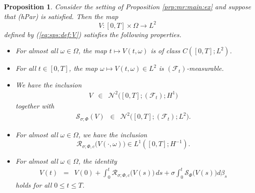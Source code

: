 \documentclass[10pt]{articleHJ}
\newcommand{\Real}{\mathbb{R}}							%
\newcommand{\sref}[1]{(\ref{#1})}                       %
\newtheorem{prop}[thm]{Proposition}
\numberwithin{equation}{section}
\begin{document}
\begin{prop}
\label{prp:sps:props:v}
Consider the setting
of Proposition
\ref{prp:mr:main:ex} and suppose that (hPar)
is satisfied.
Then the map
\begin{equation}
V: [0, T] \times \Omega \to L^2
\end{equation}
defined by \sref{eq:sps:def:V}
satisfies the following properties.
\begin{itemize}
\item[(i)]{
  For almost all $\omega \in \Omega$,
  the map
  $t \mapsto V(t,\omega)$ %
  is of class $C([0,T]; L^2)$.
}
\item[(ii)]{
  For all $t \in [0,T]$, the map
  $\omega \mapsto V(t, \omega) %
    \in L^2$ %
  is $(\mathcal{F}_t)$-measurable.
}

\item[(iii)]{
  We have the inclusion
  \begin{equation}
  \label{eq:sps:props:v:n2:h1}
  \begin{array}{lcl}
     V & \in &  \mathcal{N}^2
       \big( [0 , T] ; (\mathcal{F}_t ) ; H^1 \big)
  \end{array}
  \end{equation}
  together with
  \begin{equation}
  \label{eq:sps:props:sw:n2:h1}
  \begin{array}{lcl}
     \mathcal{S}_{\sigma;\Phi}(V)
      & \in &
       \mathcal{N}^2 \big( [0 , T] ; (\mathcal{F}_t ) ; L^2 \big).
     \end{array}
  \end{equation}
}
\item[(iv)]{
  For almost all $\omega \in \Omega$, we have the inclusion
  \begin{equation}
    \mathcal{R}_{\sigma;\Phi, c}\big( V(\cdot, \omega) \big)
      \in L^1([0,T]; H^{-1}).
  \end{equation}
}
\item[(v)]{
  For almost all $\omega \in \Omega$,
  the identity
  \begin{equation}
  \label{eq:sps:int:eg:for:v}
  \begin{array}{lcl}
  V(t) & = & V(0) + \int_0^t
     \mathcal{R}_{\sigma;\Phi, c}\big( V(s) \big)\, ds
    + \sigma \int_0^t
        \mathcal{S}_{\Phi}\big(V(s)\big)
       d \beta_s
  \end{array}
  \end{equation}
  holds for all $0 \le t \le T$. %
}
\end{itemize}
\end{prop}
\end{document}
